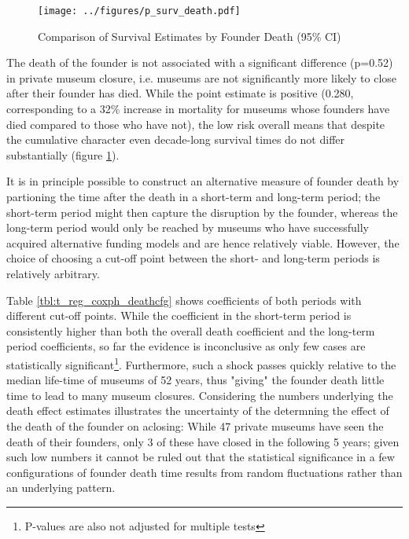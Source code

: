 \documentclass[12pt]{article}
\begin{document}
\begin{figure}[htbp]
\centering
\texttt{[image: ../figures/p\_surv\_death.pdf]}
\caption{\label{fig:p_surv_death}Comparison of Survival Estimates by Founder Death (95\% CI)}
\end{figure}

The death of the founder is not associated with a significant difference (p=0.52) in private museum closure, i.e. museums are not significantly more likely to close after their founder has died.
While the point estimate is positive (0.280, corresponding to a  32\% increase in mortality for museums whose founders have died compared to those who have not), the low risk overall means that despite the cumulative character even decade-long survival times do not differ substantially (figure \ref{fig:p_surv_death}).


It is in principle possible to construct an alternative measure of founder death by partioning the time after the death in a short-term and long-term period; the short-term period might then capture the disruption by the founder, whereas the long-term period would only be reached by museums who have successfully acquired alternative funding models and are hence relatively viable.
However, the choice of choosing a cut-off point between the short- and long-term periods is relatively arbitrary.


Table \ref{tbl:t_reg_coxph_deathcfg} shows coefficients of both periods with different cut-off points.
While the coefficient in the short-term period is consistently higher than both the overall death coefficient and the long-term period coefficients, so far the evidence is inconclusive as only few cases are statistically significant\footnote{P-values are also not adjusted for multiple tests}.
Furthermore, such a shock passes quickly relative to the median life-time of museums of 52 years, thus "giving" the founder death little time to lead to many museum closures. 
Considering the numbers underlying the death effect estimates illustrates the uncertainty of the determning the effect of the death of the founder on aclosing: 
While 47 private museums have seen the death of their founders, only 3 of these have closed in the following 5 years; given such low numbers it cannot be ruled out that the statistical significance in a few configurations of founder death time results from random fluctuations rather than an underlying pattern.
\end{document}
